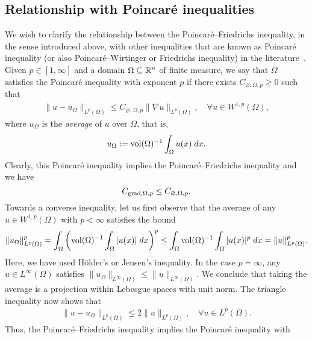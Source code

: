\documentclass[10pt,a4paper]{article}
\begin{document}
\subsection{Relationship with Poincar\'e inequalities}

We wish to clarify the relationship between the Poincar\'e--Friedrichs inequality, in the sense introduced above, with other inequalities that are known as Poincar\'e inequality (or also Poincar\'e--Wirtinger or Friedrichs inequality) in the literature~\cite[Remark~3.32]{ern2021finite}. Given $p \in [1,\infty]$ and a domain $\Omega \subseteq {\mathbb R}^{n}$ of finite measure, 
we say that $\Omega$ satisfies the Poincar\'e inequality with exponent $p$ 
if there exists $C_{\varnothing,\Omega,p} \geq 0$ such that 
\begin{align*}
    \| u - u_{\Omega} \|_{L^{p}(\Omega)}
    \leq 
    C_{\varnothing,\Omega,p} 
    \| \nabla u \|_{L^{p}(\Omega)}
    ,
    \quad 
    \forall u \in W^{1,p}(\Omega)
    ,
\end{align*}
where $u_{\Omega}$ is the \emph{average} of $u$ over $\Omega$, that is,
\begin{align*}
    u_{\Omega} := \operatorname{vol}(\Omega)^{-1} \int_{\Omega} u(x) \;dx.
\end{align*}
Clearly, this Poincar\'e inequality implies the Poincar\'e--Friedrichs inequality and we have 
\[
    C_{\operatorname{grad},\Omega,p} \leq C_{\varnothing,\Omega,p}.
\]
Towards a converse inequality, 
let us first observe that the average of any $u \in W^{1,p}(\Omega)$ with $p < \infty$ satisfies the bound 
\begin{align}\label{math:aver_norm}
    \| u_\Omega \|_{L^{p}(\Omega)}^{p}
    = 
    \int_{\Omega} \left( \operatorname{vol}(\Omega)^{-1} \int_{\Omega} |u(x)| \;dx \right)^{p}
    \leq 
    \int_{\Omega} \operatorname{vol}(\Omega)^{-1} \int_{\Omega} |u(x)|^{p} \;dx
    = 
    \| u \|_{L^{p}(\Omega)}^{p}
    .
\end{align}
Here, we have used H\"older's or Jensen's inequality. 
In the case $p = \infty$, any $u \in L^{\infty}(\Omega)$ satisfies $\| u_\Omega \|_{L^{\infty}(\Omega)} \leq \| u \|_{L^{\infty}(\Omega)}$. 
We conclude that taking the average is a projection within Lebesgue spaces with unit norm. 
The triangle inequality now shows that 
\begin{align*}
    \| u - u_\Omega \|_{L^{p}(\Omega)} 
    \leq
    2
    \| u \|_{L^{p}(\Omega)},
    \quad 
    \forall
    u \in L^{p}(\Omega)
    .
\end{align*}
Thus, the Poincar\'e--Friedrichs inequality implies the Poincar\'e inequality with 
\end{document}
